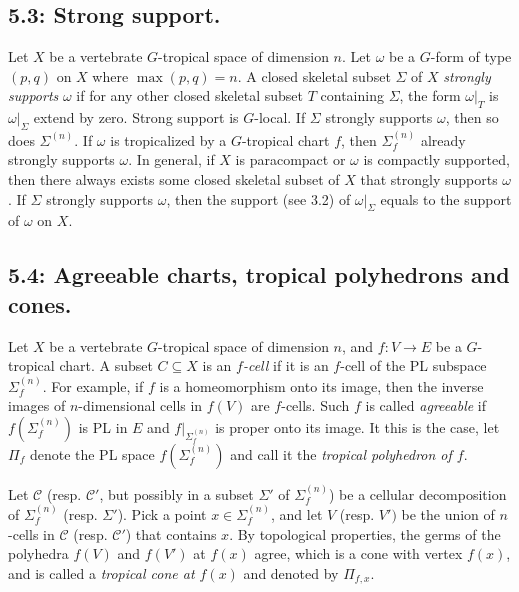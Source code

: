 \documentclass[12pt,reqno]{amsart}
\theoremstyle{definition}
\theoremstyle{remark}
\theoremstyle{citedrem}
\theoremstyle{cited}
\theoremstyle{citeddef}
\theoremstyle{step}
\begin{document}
\subsection*{5.3: Strong support.} Let $X$ be a vertebrate $G$-tropical space of dimension $n$. Let $\omega$ be a $G$-form of type $(p,q)$ on $X$ where $\max(p,q) = n$. A closed skeletal subset $\Sigma$ of $X$ \emph{strongly supports} $\omega$ if for any other closed skeletal subset $T$ containing $\Sigma$, the form $\omega|_T$ is $\omega|_{\Sigma}$ extend by zero. Strong support is $G$-local. If $\Sigma$ strongly supports $\omega$, then so does $\Sigma^{(n)}$. If $\omega$ is tropicalized by a $G$-tropical chart $f$, then $\Sigma_f^{(n)}$ already strongly supports $\omega$. In general, if $X$ is paracompact or $\omega$ is compactly supported, then there always exists some closed skeletal subset of $X$ that strongly supports $\omega$. If $\Sigma$ strongly supports $\omega$, then the support (see 3.2) of $\omega|_{\Sigma}$ equals to the support of $\omega$ on $X$. 

\subsection*{5.4: Agreeable charts, tropical polyhedrons and cones.} Let $X$ be a vertebrate $G$-tropical space of dimension $n$, and $f \colon V \to E$ be a $G$-tropical chart. A subset $C \subseteq X$ is an \emph{$f$-cell} if it is an $f$-cell of the PL subspace $\Sigma_f^{(n)}$. For example, if $f$ is a homeomorphism onto its image, then the inverse images of $n$-dimensional cells in $f(V)$ are $f$-cells. Such $f$ is called \emph{agreeable} if $f(\Sigma_f^{(n)})$ is PL in $E$ and $f|_{\Sigma_f^{(n)}}$ is proper onto its image. It this is the case, let $\Pi_f$ denote the PL space $f(\Sigma_f^{(n)})$ and call it the \emph{tropical polyhedron of $f$}. 

Let $\mathcal{C}$ (resp. $\mathcal{C}'$, but possibly in a subset $\Sigma'$ of $\Sigma_f^{(n)}$) be a cellular decomposition of $\Sigma_f^{(n)}$ (resp. $\Sigma'$). Pick a point $x \in \Sigma_f^{(n)}$, and let $V$ (resp. $V')$ be the union of $n$-cells in $\mathcal{C}$ (resp. $\mathcal{C}'$) that contains $x$. By topological properties, the germs of the polyhedra $f(V)$ and $f(V')$ at $f(x)$ agree, which is a cone with vertex $f(x)$, and is called a \emph{tropical cone at $f(x)$} and denoted by $\Pi_{f,x}$. 

\end{document}
